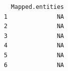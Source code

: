 \documentclass[
  letterpaper,
  DIV=11,
  numbers=noendperiod]{scrartcl}
\begin{document}
\begin{verbatim}
  Mapped.entities
1              NA
2              NA
3              NA
4              NA
5              NA
6              NA
                                                                                                                                                                                                                                                                                                                                                                                                                                                                                                                                                                                                                                                                                                                                                                                                                                                                                                                                                                                                                                                                                                                                                                                                                                                                                                                                                                                                                                                                                                                                                                                                                                                                                                                                                                                                                                                                                                                                                                                                                                                                                                                                                                                                                                                                                                                                                                                                                                                                                                                                                                                                                                                                                                                                                                                                                                                                                                                                                                                                                                                                                                                                                                                                                                                                                                                         
\end{verbatim}
\end{document}
